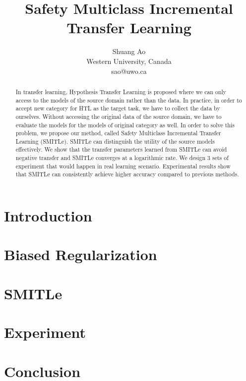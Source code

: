 \documentclass{article}
\title{Safety Multiclass Incremental Transfer Learning}
\author{Shuang Ao \\ 
Western University, Canada \\
sao@uwo.ca}
\begin{document}
\maketitle

\begin{abstract}
In transfer learning, Hypothesis Transfer Learning is proposed where we can only access to the models of the source domain rather than the data. In practice, in order to accept new category for HTL as the target task, we have to collect the data by ourselves. Without accessing the original data of the source domain, we have to evaluate the models for the models of original category as well.
In order to solve this problem, we propose our method, called Safety Multiclass Incremental Transfer Learning (SMITLe). SMITLe can distinguish the utility of the source models effectively. We show that the transfer parameters learned from SMITLe can avoid negative transfer and SMITLe converges at a logarithmic rate. We design 3 sets of experiment that would happen in real learning scenario. Experimental results show that SMITLe can consistently achieve higher accuracy compared to previous methods.
\end{abstract}
\section{Introduction}


%

\section{Biased Regularization}\label{sec:prob}


\section{SMITLe}\label{sec:smitle}


\section{Experiment}\label{sec:exp}


\section{Conclusion}


\appendix




\end{document}
